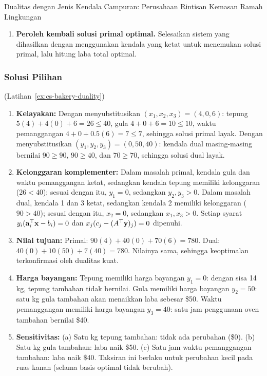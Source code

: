 \begin{ex}{Dualitas dengan Jenis Kendala Campuran: Perusahaan Rintisan Kemasan Ramah Lingkungan}{}
\begin{enumerate}
  \item \textbf{Peroleh kembali solusi primal optimal.}
  Selesaikan sistem yang dihasilkan dengan menggunakan kendala yang ketat untuk menemukan solusi primal, lalu hitung laba total optimal.
\end{enumerate}
\exrefs{\S\ref{sec:duality-forms}, \S\ref{sec:cs-solving}}
\end{ex}

\subsubsection*{Solusi Pilihan}

\begin{solution}(Latihan~\ref{ex:cs-bakery-duality})
\begin{enumerate}
\item \textbf{Kelayakan:} Dengan menyubstitusikan $(x_1, x_2, x_3) = (4, 0, 6)$: tepung $5(4) + 4(0) + 6 = 26 \leq 40$, gula $4 + 0 + 6 = 10 \leq 10$, waktu pemanggangan $4 + 0 + 0.5(6) = 7 \leq 7$, sehingga solusi primal layak. Dengan menyubstitusikan $(y_1, y_2, y_3) = (0, 50, 40)$: kendala dual masing-masing bernilai $90 \geq 90$, $90 \geq 40$, dan $70 \geq 70$, sehingga solusi dual layak.

\item \textbf{Kelonggaran komplementer:} Dalam masalah primal, kendala gula dan waktu pemanggangan ketat, sedangkan kendala tepung memiliki kelonggaran ($26 < 40$); sesuai dengan itu, $y_1 = 0$, sedangkan $y_2, y_3 > 0$. Dalam masalah dual, kendala 1 dan 3 ketat, sedangkan kendala 2 memiliki kelonggaran ($90 > 40$); sesuai dengan itu, $x_2 = 0$, sedangkan $x_1, x_3 > 0$. Setiap syarat $y_i(\mathbf{a}_i^\top \mathbf{x} - b_i) = 0$ dan $x_j(c_j - (A^\top \mathbf{y})_j) = 0$ dipenuhi.

\item \textbf{Nilai tujuan:} Primal: $90(4) + 40(0) + 70(6) = 780$. Dual: $40(0) + 10(50) + 7(40) = 780$. Nilainya sama, sehingga keoptimalan terkonfirmasi oleh dualitas kuat.

\item \textbf{Harga bayangan:} Tepung memiliki harga bayangan $y_1 = 0$: dengan sisa 14 kg, tepung tambahan tidak bernilai. Gula memiliki harga bayangan $y_2 = 50$: satu kg gula tambahan akan menaikkan laba sebesar \$50. Waktu pemanggangan memiliki harga bayangan $y_3 = 40$: satu jam penggunaan oven tambahan bernilai \$40.

\item \textbf{Sensitivitas:} (a) Satu kg tepung tambahan: tidak ada perubahan (\$0). (b) Satu kg gula tambahan: laba naik \$50. (c) Satu jam waktu pemanggangan tambahan: laba naik \$40. Taksiran ini berlaku untuk perubahan kecil pada ruas kanan (selama basis optimal tidak berubah).
\end{enumerate}
\end{solution}

